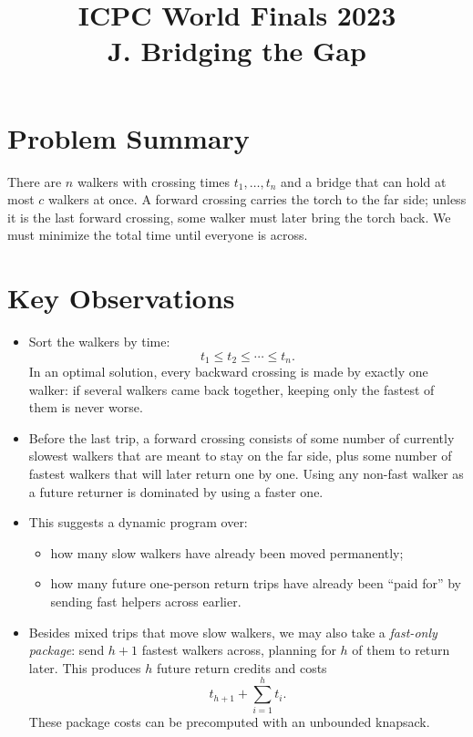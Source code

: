 \documentclass[11pt]{article}
\title{ICPC World Finals 2023\\J. Bridging the Gap}
\author{}
\date{}
\begin{document}
\maketitle

\section*{Problem Summary}

There are $n$ walkers with crossing times $t_1,\dots,t_n$ and a bridge that can hold at most $c$ walkers
at once. A forward crossing carries the torch to the far side; unless it is the last forward crossing, some
walker must later bring the torch back. We must minimize the total time until everyone is across.

\section*{Key Observations}

\begin{itemize}[leftmargin=*]
    \item Sort the walkers by time:
    \[
    t_1 \le t_2 \le \cdots \le t_n.
    \]
    In an optimal solution, every backward crossing is made by exactly one walker: if several walkers came
    back together, keeping only the fastest of them is never worse.
    \item Before the last trip, a forward crossing consists of some number of currently slowest walkers that
    are meant to stay on the far side, plus some number of fastest walkers that will later return one by one.
    Using any non-fast walker as a future returner is dominated by using a faster one.
    \item This suggests a dynamic program over:
    \begin{itemize}[leftmargin=*]
        \item how many slow walkers have already been moved permanently;
        \item how many future one-person return trips have already been ``paid for'' by sending fast helpers
        across earlier.
    \end{itemize}
    \item Besides mixed trips that move slow walkers, we may also take a \emph{fast-only package}: send
    $h+1$ fastest walkers across, planning for $h$ of them to return later. This produces $h$ future return
    credits and costs
    \[
    t_{h+1} + \sum_{i=1}^{h} t_i.
    \]
    These package costs can be precomputed with an unbounded knapsack.
\end{itemize}
\end{document}
